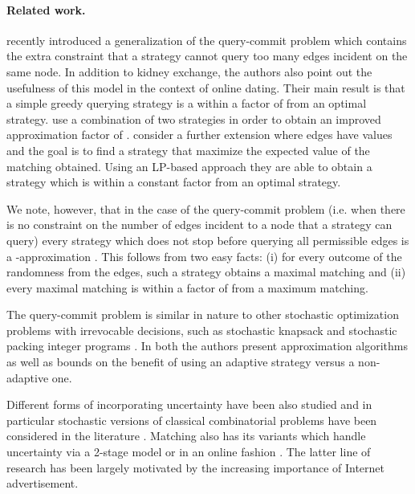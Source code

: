 \documentclass[12pt]{article}
\begin{document}
		
		\paragraph{Related work.} \cite{chen} recently introduced a generalization of the query-commit problem which contains the extra constraint that a strategy cannot query too many edges incident on the same node. In addition to kidney exchange, the authors also point out the usefulness of this model in the context of online dating. Their main result is that a simple greedy querying strategy is a within a factor of  from an optimal strategy. \cite{mestre} use a combination of two strategies in order to obtain an improved approximation factor of . \cite{viswanath} consider a further extension where edges have values and the goal is to find a strategy that maximize the expected value of the matching obtained. Using an LP-based approach they are able to obtain a strategy which is within a constant factor from an optimal strategy.
		
		We note, however, that in the case of the query-commit problem (i.e. when there is no constraint on the number of edges incident to a node that a strategy can query) every strategy which does not stop before querying all permissible edges is a -approximation \cite{chen}. This follows from two easy facts: (i) for every outcome of the randomness from the edges, such a strategy obtains a maximal matching and (ii) every maximal matching is within a factor of  from a maximum matching. 
		
		The query-commit problem is similar in nature to other stochastic optimization problems with irrevocable decisions, such as stochastic knapsack \cite{goemansKnapsack} and stochastic packing integer programs \cite{goemansIP}. In both \cite{goemansKnapsack, goemansIP} the authors present approximation algorithms as well as bounds on the benefit of using an adaptive strategy versus a non-adaptive one. 
		
		Different forms of incorporating uncertainty have been also studied \cite{SP} and in particular stochastic versions of classical combinatorial problems have been considered in the literature \cite{covering,paths}. Matching also has its variants which handle uncertainty via a 2-stage model \cite{katriel} or in an online fashion \cite{onlinePD, onlineMatching, goel, KVV, unreliable, vazirani}. The latter line of research has been largely motivated by the increasing importance of Internet advertisement.  
		
\end{document}
